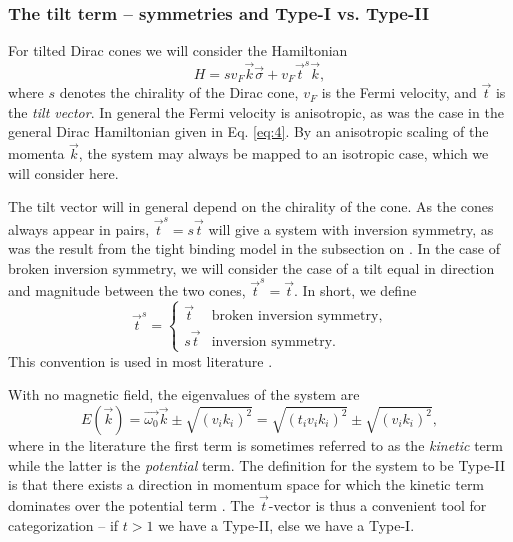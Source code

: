 
\subsubsection{The tilt term -- symmetries and Type-I vs.\! Type-II}
For tilted Dirac cones we will consider the Hamiltonian
\begin{equation}
  \label{eq:10}
  H =  s v_F \vec{k} \vec{\sigma} + v_F \vec{t}^s \vec{k},
\end{equation}
where \( s \) denotes the chirality of the Dirac cone, \( v_F \) is the Fermi velocity, and \( \vec{t} \) is the \emph{tilt vector}.
In general the Fermi velocity is anisotropic, as was the case in the general Dirac Hamiltonian given in Eq. \eqref{eq:4}.
By an anisotropic scaling of the momenta \( \vec{k} \), the system may always be mapped to an isotropic case, which we will consider here.

The tilt vector will in general depend on the chirality of the cone.
As the cones always appear in pairs, \( \vec{t}^s = s \vec{t} \) will give a system with inversion symmetry, as was the result from the tight binding model in the subsection on \emph{}.
In the case of broken inversion symmetry, we will consider the case of a tilt equal in direction and magnitude between the two cones, \( \vec{t}^s = \vec{t} \).
In short, we define
\begin{equation}
  \vec{t}^s =
  \begin{cases}
    \vec{t} & \text{broken inversion symmetry},\\
    s \vec{t} & \text{inversion symmetry}.
  \end{cases}\label{eq:11}
\end{equation}
This convention is used in most literature \cite{vanderwurffMagnetovorticalThermoelectricTransport2019,ferreirosAnomalousNernstThermal2017}.

With no magnetic field, the eigenvalues of the system are
\begin{equation}
  \label{eq:12}
  E(\vec{k}) = \vec{\omega_{0}} \vec{k} \pm \sqrt{(v_{i} k_{i})^{2}} = \sqrt{(t_{i} v_{i} k_{i})^{2}} \pm \sqrt{(v_{i} k_{i})^{2}},
\end{equation}
where in the literature the first term is sometimes referred to as the \emph{kinetic} term while the latter is the \emph{potential} term.
The definition for the system to be Type-II is that there exists a direction in momentum space for which the kinetic term dominates over the potential term \cite{soluyanovTypeIIWeylSemimetals2015}.
The \(\vec{t}\)-vector is thus a convenient tool for categorization -- if \(t > 1\) we have a Type-II, else we have a Type-I.


